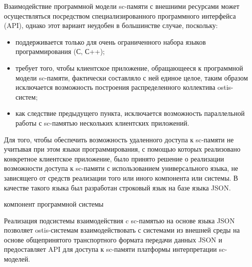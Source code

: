 Взаимодействие программной модели sc-памяти с внешними ресурсами может осуществляться посредством специализированного
программного интерфейса (API), однако этот вариант неудобен в большинстве случае, поскольку:
    \begin{itemize}
        \item поддерживается только для очень ограниченного набора языков программирования (С, С++);
        \item требует того, чтобы клиентское приложение, обращающееся к программной модели sc-памяти, фактически
        составляло с ней единое целое, таким образом исключается возможность построения распределенного коллектива
        ostis-систем;
        \item как следствие предыдущего пункта, исключается возможность параллельной работы с sc-памятью нескольких
        клиентских приложений.
    \end{itemize}
Для того, чтобы обеспечить возможность удаленного доступа к sc-памяти не учитывая при этом языки программирования, с
помощью которых реализовано конкретное клиентское приложение, было принято решение о реализации возможности доступа к
sc-памяти с использованием универсального языка, не зависящего от средств реализации того или иного компонента или
системы. В качестве такого языка был разработан строковый язык на базе языка JSON.

\begin{SCn}
\begin{scnrelfromlist}{компонент программной системы}
\end{scnrelfromlist}
\end{SCn}


Реализация подсистемы взаимодействия c sc-памятью на основе языка JSON позволяет ostis-системам
взаимодействовать с системами из внешней среды на основе общепринятого транспортного формата передачи данных JSON и
предоставляет API для доступа к sc-памяти платформы интерпретации sc-моделей.

